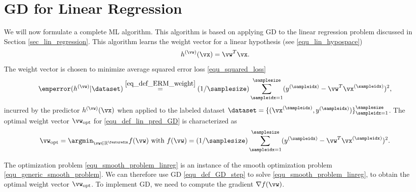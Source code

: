 \documentclass[12pt]{report}
\begin{document}
\section{GD for Linear Regression} 
\label{sec_lin_reg}

We will now formulate a complete ML algorithm. This algorithm is based on 
applying GD to the linear regression problem discussed in Section \ref{sec_lin_regression}. 
This algorithm learns the weight vector 
for a linear hypothesis (see \eqref{equ_lin_hypospace}) 
\begin{equation} 
\label{equ_def_lin_pred_GD}
h^{(\vw)}(\vx) = \vw^{T} \vx.
\end{equation}
The weight vector is chosen to minimize average 
squared error loss \eqref{equ_squared_loss}
\begin{equation} 
\label{equ_def_cost_linreg}
\emperror(h^{(\vw)}| \dataset) \stackrel{\eqref{eq_def_ERM_weight}}{=} (1/\samplesize) \sum_{\sampleidx=1}^{\samplesize} (y^{(\sampleidx)} - \vw^{T} \vx^{(\sampleidx)})^{2}, 
\end{equation}
incurred by the predictor $h^{(\vw)}(\vx)$ when applied to 
the labeled dataset $\dataset=\{ (\vx^{(\sampleidx)}, y^{(\sampleidx)}) \}_{\sampleidx=1}^{\samplesize}$. 
The optimal weight vector $\vw_{\rm opt}$ for \eqref{equ_def_lin_pred_GD} is 
characterized as
\begin{equation} 
\label{equ_smooth_problem_linreg}
\vw_{\rm opt} = \argmin_{\vw \in \mathbb{R}^{\featuredim}} f(\vw) \mbox{ with } f(\vw) = (1/\samplesize) \sum_{\sampleidx=1}^{\samplesize} (y^{(\sampleidx)} - \vw^{T} \vx^{(\sampleidx)})^{2}. 
\end{equation} 

The optimization problem \eqref{equ_smooth_problem_linreg} is an instance of the smooth 
optimization problem \eqref{equ_generic_smooth_problem}.  
We can therefore use GD \eqref{equ_def_GD_step} to solve \eqref{equ_smooth_problem_linreg}, 
to obtain the optimal weight vector $\vw_{\rm opt}$. To implement GD, we need to compute 
the gradient $\nabla f(\vw)$. 
\end{document}
